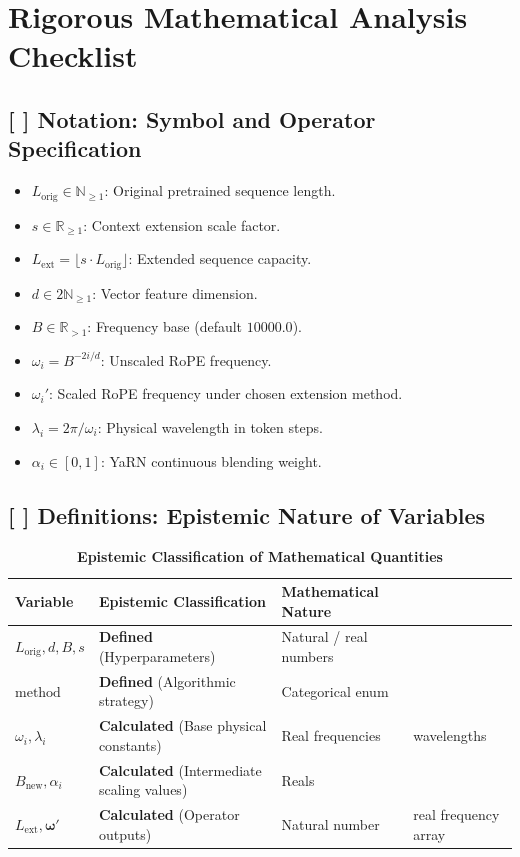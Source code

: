 \documentclass[11pt,a4paper]{article}
\theoremstyle{definition}
\begin{document}
\section{Rigorous Mathematical Analysis Checklist}

\subsection{[ ] Notation: Symbol and Operator Specification}
\begin{itemize}
    \item $L_{\text{orig}} \in \mathbb{N}_{\ge 1}$: Original pretrained sequence length.
    \item $s \in \mathbb{R}_{\ge 1}$: Context extension scale factor.
    \item $L_{\text{ext}} = \lfloor s \cdot L_{\text{orig}} \rfloor$: Extended sequence capacity.
    \item $d \in 2\mathbb{N}_{\ge 1}$: Vector feature dimension.
    \item $B \in \mathbb{R}_{> 1}$: Frequency base (default $10000.0$).
    \item $\omega_i = B^{-2i/d}$: Unscaled RoPE frequency.
    \item $\omega_i'$: Scaled RoPE frequency under chosen extension method.
    \item $\lambda_i = 2\pi / \omega_i$: Physical wavelength in token steps.
    \item $\alpha_i \in [0, 1]$: YaRN continuous blending weight.
\end{itemize}

\subsection{[ ] Definitions: Epistemic Nature of Variables}
\begin{table}[h]
\centering
\caption{\textbf{Epistemic Classification of Mathematical Quantities}}
\begin{tabular}{lll}
\toprule
\textbf{Variable} & \textbf{Epistemic Classification} & \textbf{Mathematical Nature} \\
\midrule
$L_{\text{orig}}, d, B, s$ & \textbf{Defined} (Hyperparameters) & Natural / real numbers \\
$\text{method}$ & \textbf{Defined} (Algorithmic strategy) & Categorical enum \\
$\omega_i, \lambda_i$ & \textbf{Calculated} (Base physical constants) & Real frequencies & wavelengths \\
$B_{\text{new}}, \alpha_i$ & \textbf{Calculated} (Intermediate scaling values) & Reals \\
$L_{\text{ext}}, \boldsymbol{\omega}'$ & \textbf{Calculated} (Operator outputs) & Natural number & real frequency array \\
\bottomrule
\end{tabular}
\end{table}
\end{document}
